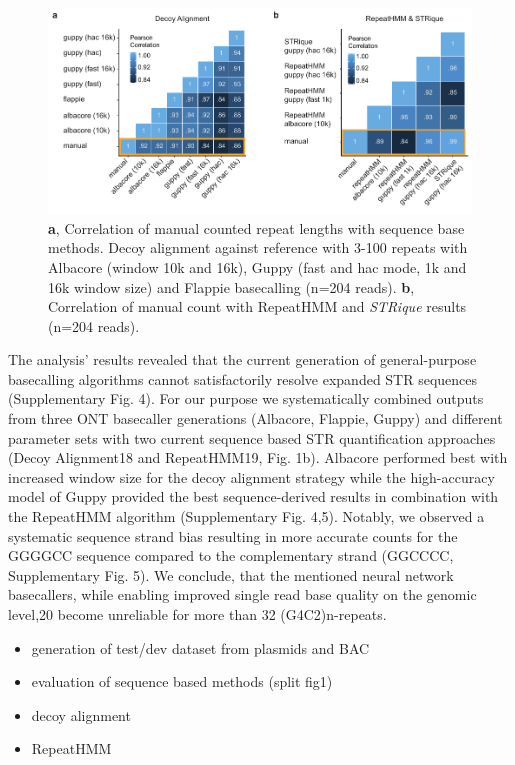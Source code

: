 \begin{figure}[h]
	\centering
	\includegraphics[width=1.0\textwidth]{figures/strique/count_sequence_corr.pdf}
	\captionsetup{format=plain}
	\caption[Correlation of sequence based STR detection methods]{\textbf{a}, Correlation of manual counted repeat lengths with sequence base methods. Decoy alignment against reference with 3-100 repeats with Albacore (window 10k and 16k), Guppy (fast and hac mode, 1k and 16k window size) and Flappie basecalling (n=204 reads). \textbf{b}, Correlation of manual count with RepeatHMM and \textit{STRique} results (n=204 reads).}
	\label{fig:strique:count_sequence_corr}
\end{figure}

The analysis’ results revealed that the current generation of general-purpose basecalling algorithms cannot satisfactorily resolve expanded STR sequences (Supplementary Fig. 4). For our purpose we systematically combined outputs from three ONT basecaller generations (Albacore, Flappie, Guppy) and different parameter sets with two current sequence based STR quantification approaches (Decoy Alignment18 and RepeatHMM19, Fig. 1b). Albacore performed best with increased window size for the decoy alignment strategy while the high-accuracy model of Guppy provided the best sequence-derived results in combination with the RepeatHMM algorithm (Supplementary Fig. 4,5). Notably, we observed a systematic sequence strand bias resulting in more accurate counts for the GGGGCC sequence compared to the complementary strand (GGCCCC, Supplementary Fig. 5). We conclude, that the mentioned neural network basecallers, while enabling improved single read base quality on the genomic level,20 become unreliable for more than 32 (G4C2)n-repeats.


\begin{itemize}
    \item generation of test/dev dataset from plasmids and BAC
    \item evaluation of sequence based methods (split fig1)
    \item decoy alignment
    \item RepeatHMM
\end{itemize}



